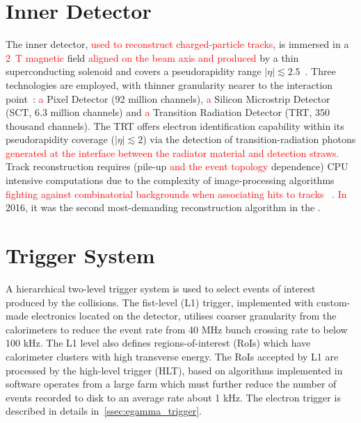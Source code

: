 \section{Inner Detector}\label{sec:track}

The inner detector, \textcolor{red}{used to reconstruct charged-particle tracks}, is immersed in a
\textcolor{red}{\SI{2}{\tesla} magnetic} field \textcolor{red}{aligned on the beam axis and produced} by a thin superconducting solenoid
and covers a pseudorapidity range $|\eta| \lesssim 2.5$~\cite{PERF-2007-01}.
Three technologies are employed, with thinner granularity nearer to the
interaction point~\cite{PERF-2015-08,inner_tdr1,inner_tdr2}: \textcolor{red}{a} Pixel Detector (92
million channels), \textcolor{red}{a} Silicon Microstrip Detector (SCT, 6.3 million channels) and
\textcolor{red}{a} Transition Radiation Detector (TRT, 350 thousand channels). The TRT offers
electron identification capability within its pseudorapidity coverage ($|\eta|
\lesssim 2$) via the detection of transition-radiation photons \textcolor{red}{generated at the interface between the radiator material and detection straws.} Track reconstruction requires (pile-up \textcolor{red}{and the event topology} dependence) CPU intensive
computations due to the complexity of image-processing algorithms \textcolor{red}{fighting against combinatorial backgrounds when associating hits to tracks ~\cite{PERF-2015-08}. In} 2016, it was the second
most-demanding reconstruction algorithm in the \hlt{}.

\section{Trigger System}\label{sec:atlas_trigger}

A hierarchical two-level trigger system is used to select events of interest produced by the collisions. The fist-level (L1) trigger, implemented with custom-made electronics located on the detector, utilises coarser granularity from the calorimeters to reduce the event rate from 40 MHz bunch crossing rate to below 100 kHz. The L1 level also defines regions-of-interest (RoIs) which have calorimeter clusters with high transverse energy. The RoIs accepted by L1 are processed by the high-level trigger (HLT), based on algorithms implemented in software operates from a large farm which must further reduce the number of events recorded to disk to an average rate about 1 kHz. The electron trigger is described in details in~\ref{ssec:egamma_trigger}.




